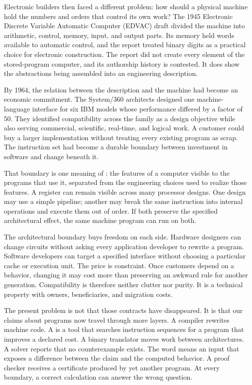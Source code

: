 Electronic builders then faced a different problem: how should a physical
machine hold the numbers and orders that control its own work? The 1945
Electronic Discrete Variable Automatic Computer (EDVAC) draft divided the
machine into arithmetic, control, memory, input, and output parts. Its memory
held words available to automatic control, and the report
treated binary digits as a practical choice for electronic construction.
\autocite{vonneumann1945edvac} The report did not create every element of the
stored-program computer, and its authorship history is contested. It does show
the abstractions being assembled into an engineering description.

By 1964, the relation between the description and the machine had become an
economic commitment. The System/360 architects designed one machine-language
interface for six IBM models whose performance differed by a factor of 50.
They identified compatibility across the family as a design objective while
also serving commercial, scientific, real-time, and logical work.
\autocite{amdahl1964system360} A customer could buy a larger implementation
without treating every existing program as scrap. The instruction set had
become a durable boundary between investment in software and change beneath
it.

That boundary is one meaning of : the features
of a computer visible to the programs that use it, separated from the
engineering choices used to realize those features. A register can remain
visible across many processor designs. One design may use a simple pipeline;
another may break the same instruction into internal operations and execute
them out of order. If both preserve the specified architectural effect, the
same machine program can run on both.

The architectural boundary buys freedom on each side. Hardware designers can change
circuits without asking every application developer to rewrite a program.
Software developers can target a specified interface without choosing a
particular cache or execution unit. The price is constraint. Once customers
depend on a behavior, changing it may cost more than preserving an awkward
rule for another generation. Compatibility is therefore neither clutter nor
purity. It is a technical property with owners, beneficiaries, and migration
costs.

The present problem is not that those contracts have disappeared. It is that
our claims about programs now travel through more layers. A compiler rewrites
machine code. A  is a tool that searches instruction
sequences for a program that improves a declared cost. A binary
translator moves work between architectures. A solver reports that no
counterexample exists. The word  means an input that
exposes a difference between the claim and the computed behavior. A proof
checker receives a certificate produced by yet
another program. At every boundary, a correct calculation can answer the
wrong question.

